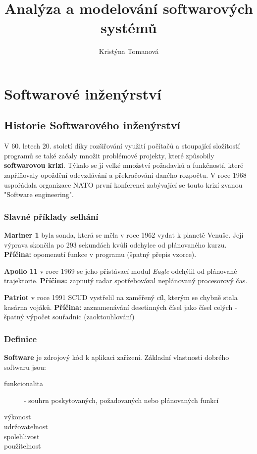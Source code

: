\documentclass[11pt,a4paper]{book}   %
\author{Kristýna Tomanová}
\title{Analýza a modelování softwarových systémů}
\begin{document}
\chapter{Softwarové inženýrství}

\section{Historie Softwarového inženýrství}

V 60. letech 20. století díky rozšiřování využití počítačů a stoupající složitostí programů se také začaly množit problémové projekty, které způsobily \textbf{softwarovou krizi}. Týkalo se jí velké množství požadavků a funkčností, které zapříňovaly opoždění odevzdávání a překračování daného rozpočtu. V roce 1968 uspořádala organizace NATO první konferenci zabývající se touto krizí zvanou "Software engineering".


\subsection{Slavné příklady selhání}

\textbf{Mariner 1} byla sonda, která se měla v roce 1962 vydat k planetě Venuše. Její výprava skončila po 293 sekundách kvůli odchylce od plánovaného kurzu. \textbf{Příčina:} opomenutí funkce v programu (špatný přepis vzorce).

\textbf{Apollo 11} v roce 1969 se jeho přistávací modul \textit{Eagle} odchýlil od plánované trajektorie. \textbf{Příčina:} zapnutý radar spotřebovával neplánovaný procesorový čas. 

\textbf{Patriot} v roce 1991 SCUD vystřelil na zaměřený cíl, kterým se chybně stala kasárna vojáků. \textbf{Příčina:} zaznamenávání desetinných čísel jako čísel celých - špatný výpočet souřadnic (zaoktouhlování)


\subsection{Definice}

\textbf{Software} je zdrojový kód k aplikaci zařízení. Základní vlastnosti dobrého softwaru jsou:
\begin{description}
  \item[funkcionalita] - souhrn poskytovaných, požadovaných nebo plánovaných funkcí
  \item[výkonost]
  \item[udržovatelnost]
  \item[spolehlivost]
  \item[použitelnost]
\end{description}
\end{document}
